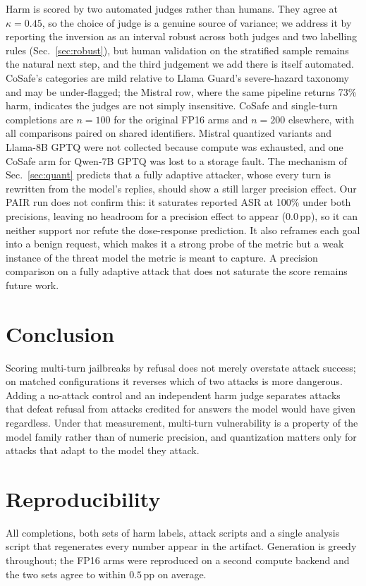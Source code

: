 \documentclass[10pt,twocolumn]{article}
\newcommand{\pp}{\,pp}
\begin{document}
Harm is scored by two automated judges rather than humans. They agree at
$\kappa=0.45$, so the choice of judge is a genuine source of variance; we address
it by reporting the inversion as an interval robust across both judges and two
labelling rules (Sec.~\ref{sec:robust}), but human validation on the stratified
sample remains the natural next step, and the third judgement we add there is
itself automated. CoSafe's categories are mild relative to Llama Guard's
severe-hazard taxonomy and may be under-flagged; the Mistral row, where the same
pipeline returns 73\% harm, indicates the judges are not simply insensitive.
CoSafe and single-turn completions are $n{=}100$ for the original FP16 arms and
$n{=}200$ elsewhere, with all comparisons paired on shared identifiers. Mistral
quantized variants and Llama-8B GPTQ were not collected because compute was
exhausted, and one CoSafe arm for Qwen-7B GPTQ was lost to a storage fault. The
mechanism of Sec.~\ref{sec:quant} predicts that a fully adaptive attacker, whose
every turn is rewritten from the model's replies, should show a still larger
precision effect. Our PAIR run does not confirm this: it saturates reported ASR
at 100\% under both precisions, leaving no headroom for a precision effect to
appear ($0.0$\pp), so it can neither support nor refute the dose-response
prediction. It also reframes each goal into a benign request, which makes it a
strong probe of the metric but a weak instance of the threat model the metric is
meant to capture. A precision comparison on a fully adaptive attack that does not
saturate the score remains future work.

\section{Conclusion}

Scoring multi-turn jailbreaks by refusal does not merely overstate attack
success; on matched configurations it reverses which of two attacks is more
dangerous. Adding a no-attack control and an independent harm judge separates
attacks that defeat refusal from attacks credited for answers the model would
have given regardless. Under that measurement, multi-turn vulnerability is a
property of the model family rather than of numeric precision, and quantization
matters only for attacks that adapt to the model they attack.

\section*{Reproducibility}

All completions, both sets of harm labels, attack scripts and a single analysis
script that regenerates every number appear in the artifact. Generation is greedy
throughout; the FP16 arms were reproduced on a second compute backend and the two
sets agree to within $0.5$\pp{} on average.

\nocite{*}   %


\end{document}
